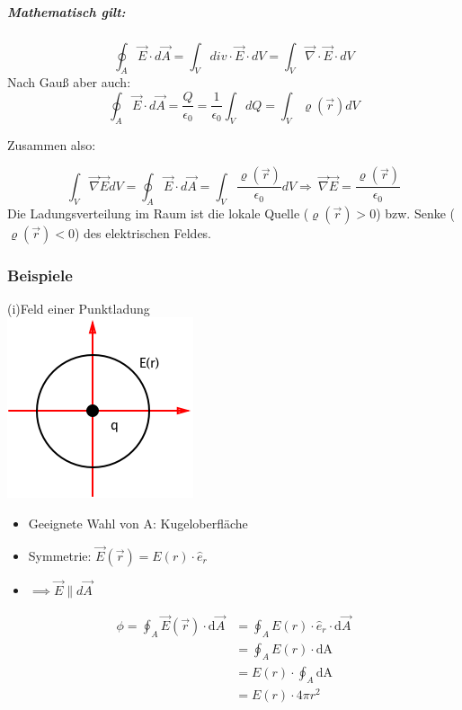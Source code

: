 \documentclass[11pt]{article}
\begin{document}
\subparagraph{Mathematisch gilt:}

$$\oint_{A}\vec{E}\cdot d\vec{A}=\int_{V} div\cdot \vec{E}\cdot dV=\int_{V}\vec{\nabla}\cdot\vec{E}\cdot dV$$
Nach Gauß aber auch:
$$\oint_{A}\vec{E}\cdot d\vec{A}=\frac{Q}{\epsilon_0}=\frac{1}{\epsilon_0}\int_VdQ=\int_V\varrho(\vec r)dV$$

Zusammen also:

$$\int_{V}\vec{\nabla}\vec{E}dV=\oint_{A}\vec{E}\cdot d\vec{A}=\int_{V}\frac{\varrho(\vec{r})}{\epsilon_0}dV
\Rightarrow\boxed{\ \vec{\nabla}\vec{E}=\frac{\varrho(\vec{r})}{\epsilon_0}}$$
Die Ladungsverteilung im Raum ist die lokale Quelle ($\varrho(\vec{r})>0$) bzw. Senke ($\varrho(\vec{r})<0$) des elektrischen Feldes.

\subsubsection{Beispiele}

(i)Feld einer Punktladung\\

\includegraphics{skizzen/14/14_6B2}\\

\begin{itemize}
	\item Geeignete Wahl von A: Kugeloberfläche
	\item Symmetrie: $\vec{E}(\vec{r})=E(r)\cdot\hat e_r$
	\item $\implies \vec{E}\parallel d\vec{A}$
\end{itemize}

\begin{align*}
	\phi=\oint_{A}\vec{E}(\vec{r})\cdot\mathrm{d}\vec{A} & = \oint_{A}E(r)\cdot\hat{e}_r\cdot\mathrm{d}\vec{A}\\
	&=\oint_{A}E(r)\cdot\mathrm{dA}\\
	&= E(r)\cdot\oint_{A}\mathrm{dA}\\
	&= E(r)\cdot4\pi r^2
\end{align*}
\end{document}
